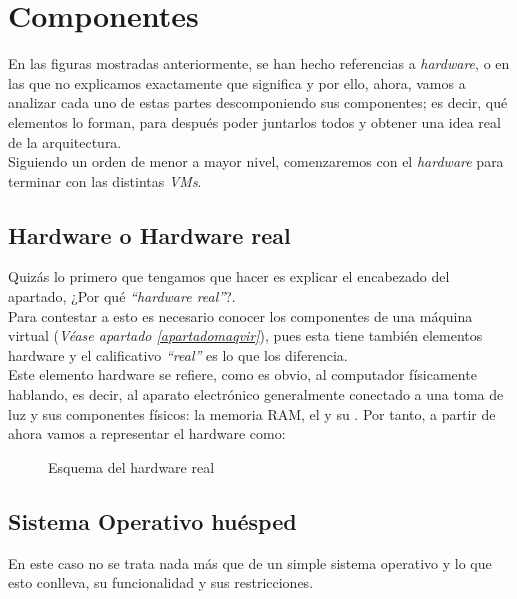 \section{Componentes}
En las figuras mostradas anteriormente, se han hecho referencias a \emph{hardware}, \emph{} o \emph{} en las que no explicamos exactamente que significa y por ello, ahora, vamos a analizar cada uno de estas partes descomponiendo sus componentes; es decir, qué elementos lo forman, para después poder juntarlos todos y obtener una idea real de la arquitectura.\\

Siguiendo un orden de menor a mayor nivel, comenzaremos con el \emph{hardware} para terminar con las distintas \emph{VMs}.

\subsection{Hardware o Hardware real}
Quizás lo primero que tengamos que hacer es explicar el encabezado del apartado, ¿Por qué \emph{\textquotedblleft hardware real\textquotedblright}?.\\
Para contestar a esto es necesario conocer los componentes de una máquina virtual (\textit{Véase apartado \ref{apartadomaqvir}}), pues esta tiene también elementos hardware y el calificativo \emph{\textquotedblleft real\textquotedblright} es lo que los diferencia.\\

Este elemento hardware se refiere, como es obvio, al computador físicamente hablando, es decir, al aparato electrónico generalmente conectado a una toma de luz y sus componentes físicos: la memoria RAM, el   y su . Por tanto, a partir de ahora vamos a representar el hardware como:

\begin{figure}[H]
\begin{center}
\end{center}
\caption[Hardware Real]{Esquema del hardware real}
\end{figure}

\subsection{Sistema Operativo huésped}\label{sohost}
En este caso no se trata nada más que de un simple sistema operativo y lo que esto conlleva, su funcionalidad y sus restricciones.\\

